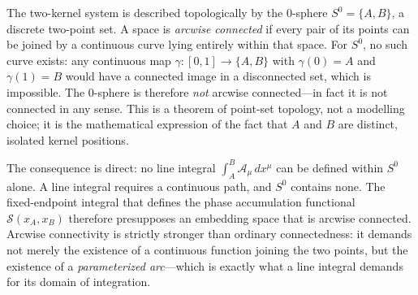 \documentclass[%
 reprint, amsmath,amssymb, aps, prb, ]{revtex4-2}
\numberwithin{equation}{section}
\begin{document}
The two-kernel system is described topologically by the 0-sphere $S^0 = \{A, B\}$, a discrete two-point set. A space is \emph{arcwise connected} if every pair of its points can be joined by a continuous curve lying entirely within that space. For $S^0$, no such curve exists: any continuous map $\gamma:[0,1]\to\{A,B\}$ with $\gamma(0)=A$ and $\gamma(1)=B$ would have a connected image in a disconnected set, which is impossible. The 0-sphere is therefore \emph{not} arcwise connected---in fact it is not connected in any sense. This is a theorem of point-set topology, not a modelling choice; it is the mathematical expression of the fact that $A$ and $B$ are distinct, isolated kernel positions.

The consequence is direct: no line integral $\int_A^B \mathcal{A}_\mu\,dx^\mu$ can be defined within $S^0$ alone. A line integral requires a continuous path, and $S^0$ contains none. The fixed-endpoint integral that defines the phase accumulation functional $\mathcal{S}(x_A,x_B)$ therefore presupposes an embedding space that is arcwise connected. Arcwise connectivity is strictly stronger than ordinary connectedness: it demands not merely the existence of a continuous function joining the two points, but the existence of a \emph{parameterized arc}---which is exactly what a line integral demands for its domain of integration.

\end{document}
